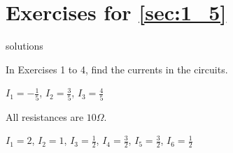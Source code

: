 \newpage

\section*{Exercises for \ref{sec:1_5}}

\begin{Filesave}{solutions}
\end{Filesave}

In Exercises 1 to 4, find the currents in the circuits.
\begin{multicols}{2}
\begin{ex}
\begin{figure}[H]
\vspace*{-2em}
\centering

\end{figure}
\end{ex}

\vspace*{-2em}
\begin{ex}
\begin{figure}[H]
\centering

\end{figure}
\begin{sol}
$ I_1 = -\frac{1}{5}$, $I_2 = \frac{3}{5}$, $I_3 = \frac{4}{5} $
\end{sol}
\end{ex}

\begin{ex}
\begin{figure}[H]
\centering

\end{figure}
\end{ex}

\vspace*{-2em}
\begin{ex}
All resistances are $10 \Omega$.

\begin{figure}[H]
\centering

\end{figure}
\begin{sol}
$ I_1 = 2$, $I_2 = 1$, $I_3 = \frac{1}{2}$, $I_4 = \frac{3}{2}$, $I_5 = \frac{3}{2}$, $I_6 = \frac{1}{2}$


\end{sol}
\end{ex}
\end{multicols}
